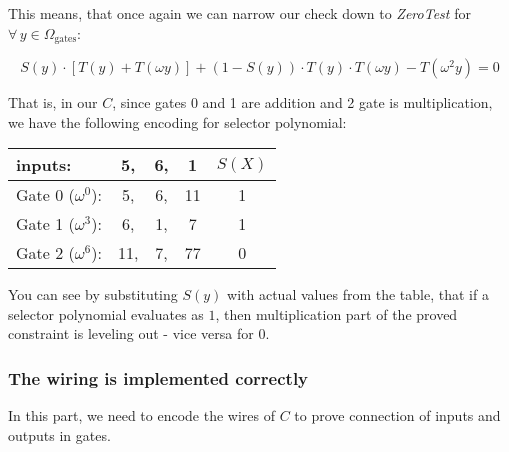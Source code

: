 \documentclass[../lecture-notes.tex]{subfiles}
\begin{document}
This means, that once again we can narrow our check down to \textit{ZeroTest} for \(\forall \, y \in \Omega_{\text{gates}}\):

\[S(y) \cdot [T(y) + T(\omega y)] + (1 - S(y)) \cdot T(y) \cdot T(\omega y) - T(\omega^2 y) = 0\]

\begin{example}

That is, in our \(C\), since gates 0 and 1 are addition and 2 gate is multiplication, we have the following encoding for selector polynomial:

\begin{tabular}{l ccc | c}
  inputs: & 5, & 6, & 1 & $S(X)$ \\ \hline
  Gate 0 ($\omega^0$): & 5, & 6, & 11 & 1 \\
  Gate 1 ($\omega^3$): & 6, & 1, & 7 & 1 \\
  Gate 2 ($\omega^6$): & 11, & 7, & 77 & 0 \\ 
\end{tabular}

You can see by substituting \(S(y)\) with actual values from the table, that if a selector polynomial evaluates as \(1\), then multiplication part of the proved constraint is leveling out - vice versa for \(0\).

\end{example}

\subsubsection{The wiring is implemented correctly}
In this part, we need to encode the wires of \(C\) to prove connection of inputs and outputs in gates. 
\end{document}
